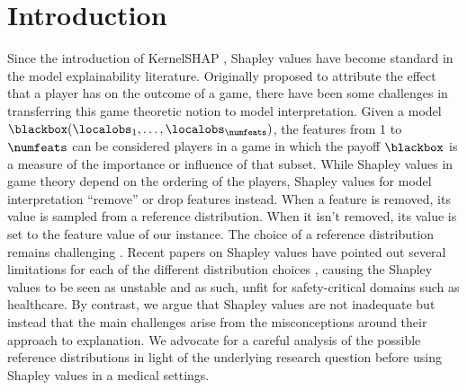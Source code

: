 \documentclass[nohyperref]{article}
\theoremstyle{plain}
\theoremstyle{definition}
\theoremstyle{remark}
\begin{document}
\section{Introduction}
Since the introduction of KernelSHAP \cite{lundberg2017unified}, Shapley values have become standard in the model explainability literature. Originally proposed to attribute the effect that a player has on the outcome of a game, there have been some challenges in transferring this game theoretic notion to model interpretation. Given a model $\blackbox(\localobs_1,\ldots,\localobs_{\numfeats})$, the features from 1 to $\numfeats$ can be considered players in a game in which the payoff $\blackbox$ is a measure of the importance or influence of that subset. While Shapley values in game theory depend on the ordering of the players, Shapley values for model interpretation ``remove'' or drop features instead. When a feature is removed, its value is sampled from a reference distribution. When it isn't removed, its value is set to the feature value of our instance. The choice of a reference distribution remains challenging \cite{aas2019explaining, janzing2020feature, frye2020shapley}. %
Recent papers on Shapley values have pointed out several limitations for each of the different distribution choices  \cite{kumar2020problems, fryer2021shapley}, causing the Shapley values to be seen as unstable and as such, unfit for safety-critical domains such as healthcare. By contrast, we argue that Shapley values are not inadequate but instead that the main challenges arise from the misconceptions around their approach to explanation. We advocate for a careful analysis of the possible reference distributions in light of the underlying research question before using Shapley values in a medical settings.
\vspace*{-0.1cm}
\end{document}
